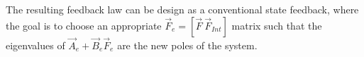 The resulting feedback law can be design as a conventional state feedback, where the goal is to choose an appropriate $\vec{F}_e=[\vec{F} \ \vec{F}_{Int}]$ matrix such that the eigenvalues of $\vec{A}_e+\vec{B}_e\vec{F}_e$ are the new poles of the system.




